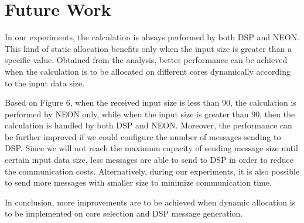 \section{Future Work}
In our experiments, the calculation is always performed by both DSP and NEON.
This kind of static allocation benefits only when the input size is greater than a specific value.
Obtained from the analysis, better performance can be achieved when the 
calculation is to be allocated on different cores dynamically according to the input data size.

Based on Figure 6, when the received input size is less than 90, the calculation is performed by NEON only,
while when the input size is greater than 90, then the calculation is handled by both DSP and NEON.
Moreover, the performance can be further improved if we could configure the number of messages sending to DSP.
Since we will not reach the maximum capacity of sending message size until certain input data size, 
less messages are able to send to DSP in order to reduce the communication costs. Alternatively, 
during our experiments, it is also possible to send more messages with smaller size to minimize communication time.

In conclusion, more improvements are to be achieved when dynamic allocation is to be implemented on core selection and 
DSP message generation.